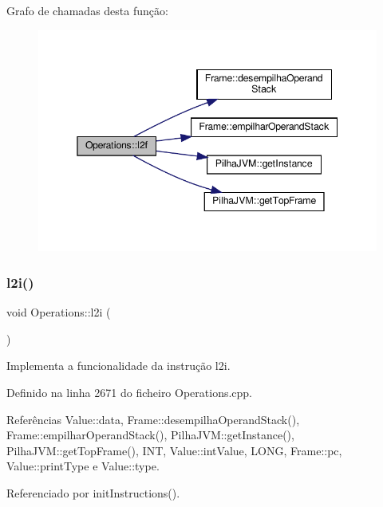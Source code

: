 Grafo de chamadas desta função\+:
\nopagebreak
\begin{figure}[H]
\begin{center}
\leavevmode
\includegraphics[width=345pt]{classOperations_af2064cce9ba6f6a4be257354f21f537e_cgraph}
\end{center}
\end{figure}
\mbox{\label{classOperations_ad5820d99e67f4856e110685b775c5e9b}} 
\subsubsection{\texorpdfstring{l2i()}{l2i()}}
{\footnotesize\ttfamily void Operations\+::l2i (\begin{DoxyParamCaption}{ }\end{DoxyParamCaption})\hspace{0.3cm}{\ttfamily [private]}}



Implementa a funcionalidade da instrução l2i. 



Definido na linha 2671 do ficheiro Operations.\+cpp.



Referências Value\+::data, Frame\+::desempilha\+Operand\+Stack(), Frame\+::empilhar\+Operand\+Stack(), Pilha\+J\+V\+M\+::get\+Instance(), Pilha\+J\+V\+M\+::get\+Top\+Frame(), I\+NT, Value\+::int\+Value, L\+O\+NG, Frame\+::pc, Value\+::print\+Type e Value\+::type.



Referenciado por init\+Instructions().

